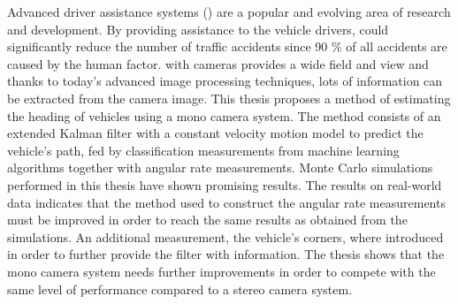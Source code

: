 Advanced driver assistance systems (\abbrADAS) are a popular and evolving area of research and development.
By providing assistance to the vehicle drivers, \abbrADAS could significantly reduce the number of traffic accidents since 90 \% of all accidents are caused by the human factor.
\abbrADAS with cameras provides a wide field and view and thanks to today's advanced image processing techniques, lots of information can be extracted from the camera image.
This thesis proposes a method of estimating the heading of vehicles using a mono camera system.
The method consists of an extended Kalman filter with a constant velocity motion model to predict the vehicle's path, fed by classification measurements from machine learning algorithms together with angular rate measurements.
Monte Carlo simulations performed in this thesis have shown promising results.
The results on real-world data indicates that the method used to construct the angular rate measurements must be improved in order to reach the same results as obtained from the simulations.
An additional measurement, the vehicle's corners, where introduced in order to further provide the filter with information.
The thesis shows that the mono camera system needs further improvements in order to compete with the same level of performance compared to a stereo camera system.